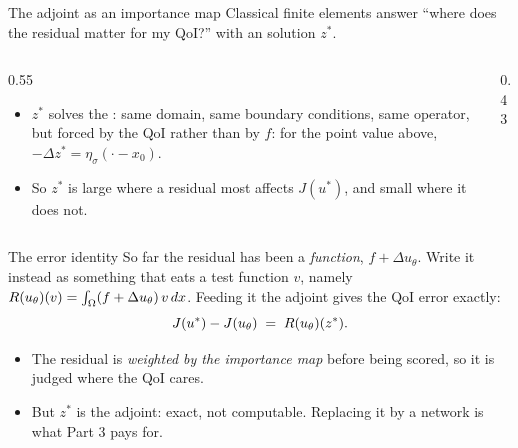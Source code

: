\documentclass[11pt,aspectratio=169]{beamer}
\begin{document}
\begin{frame}{The adjoint as an importance map}
  Classical finite elements answer ``where does the residual matter for my QoI?''
  with an  solution $z^*$.
  \begin{columns}[c]
    \begin{column}{0.55\textwidth}
      \begin{itemize}\itemsep0.4em
        \item $z^*$ solves the : same domain, same
              boundary conditions, same operator, but forced by the QoI rather
              than by $f$: for the point value above, $-\Delta z^* = \eta_\sigma(\cdot - x_0)$.
        \item So $z^*$ is large where a residual most affects $J(u^*)$, and small
              where it does not.
      \end{itemize}
    \end{column}
    \begin{column}{0.43\textwidth}
      \centering
    \end{column}
  \end{columns}
\end{frame}

\begin{frame}{The error identity}
  So far the residual has been a \emph{function}, $f + \Delta u_\theta$. Write it
  instead as something that eats a test function $v$, namely
  $R(u_\theta)(v) = \int_\Omega (f + \Delta u_\theta)\, v \, dx$. Feeding it the
  adjoint gives the QoI error exactly:
  \[
    J(u^*) - J(u_\theta) \;=\; R(u_\theta)(z^*) .
  \]
  \begin{itemize}\itemsep0.5em
    \item The residual is \emph{weighted by the importance map} before being
          scored, so it is judged where the QoI cares.
    \item But $z^*$ is the  adjoint: exact, not computable.
          Replacing it by a network is what Part 3 pays for.
  \end{itemize}
\end{frame}
\end{document}
